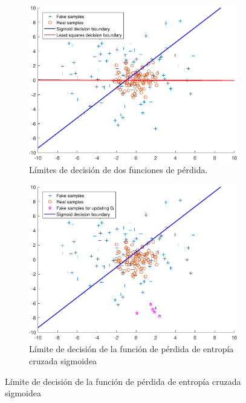 \begin{figure}[H]
    \centering
    \captionsetup{justification=centering}

    \begin{subfigure}{.30\linewidth}
        \centering
        \includegraphics[width=0.95\linewidth]{figures/chapter02/boundary_1.pdf}
        \caption{Límites de decisión de dos funciones de pérdida. }
        \label{subfig:LSGAN-1}
    \end{subfigure}\hfill
    \begin{subfigure}{.30\linewidth}
        \centering
        \includegraphics[width=0.95\linewidth]{figures/chapter02/boundary_2.pdf}
        \caption{Límite de decisión de la función de pérdida de entropía cruzada sigmoidea}
        \label{subfig:LSGAN-2}
    \end{subfigure}\hfill

\end{figure}
